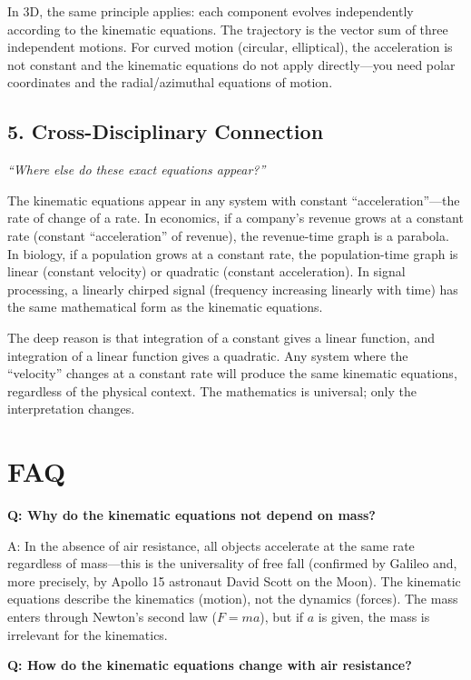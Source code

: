 In 3D, the same principle applies: each component evolves independently according to the kinematic equations. The trajectory is the vector sum of three independent motions. For curved motion (circular, elliptical), the acceleration is not constant and the kinematic equations do not apply directly---you need polar coordinates and the radial/azimuthal equations of motion.

\subsection*{5. Cross-Disciplinary Connection}
\textit{``Where else do these exact equations appear?''}

The kinematic equations appear in any system with constant ``acceleration''---the rate of change of a rate. In economics, if a company's revenue grows at a constant rate (constant ``acceleration'' of revenue), the revenue-time graph is a parabola. In biology, if a population grows at a constant rate, the population-time graph is linear (constant velocity) or quadratic (constant acceleration). In signal processing, a linearly chirped signal (frequency increasing linearly with time) has the same mathematical form as the kinematic equations.

The deep reason is that integration of a constant gives a linear function, and integration of a linear function gives a quadratic. Any system where the ``velocity'' changes at a constant rate will produce the same kinematic equations, regardless of the physical context. The mathematics is universal; only the interpretation changes.

\section*{FAQ}

\textbf{Q: Why do the kinematic equations not depend on mass?}

A: In the absence of air resistance, all objects accelerate at the same rate regardless of mass---this is the universality of free fall (confirmed by Galileo and, more precisely, by Apollo 15 astronaut David Scott on the Moon). The kinematic equations describe the kinematics (motion), not the dynamics (forces). The mass enters through Newton's second law ($F = ma$), but if $a$ is given, the mass is irrelevant for the kinematics.

\textbf{Q: How do the kinematic equations change with air resistance?}


